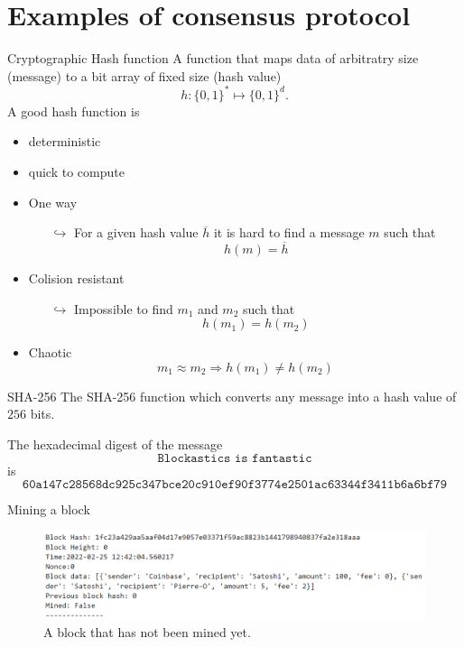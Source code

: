 \documentclass{beamer}
\begin{document}
\section{Examples of consensus protocol}
\begin{frame}{Cryptographic Hash function}
\small
A function that maps data of arbitratry size (message) to a bit array of fixed size (hash value)
$$
h:\{0,1\}^\ast\mapsto \{0,1\}^d. 
$$
A good hash function is
\begin{itemize}
\item deterministic
\item quick to compute
\item One way
\begin{itemize}
  \scriptsize
\item[$\hookrightarrow$] For a given hash value $\overline{h}$ it is hard to find a message $m$ such that 
$$
h(m) = \overline{h}
$$
\end{itemize}
\item Colision resistant 
\begin{itemize}
\item[$\hookrightarrow$] Impossible to find $m_1$ and $m_2$ such that 
$$
h(m_1) = h(m_2)
$$
\end{itemize}
\item Chaotic
$$m_1\approx m_2\Rightarrow  h(m_1) \neq h(m_2)$$
\end{itemize}
\end{frame}
\begin{frame}{SHA-256}
The SHA-256 function which converts any message into a hash value of $256$ bits.
\begin{tcolorbox}[enhanced,drop shadow, title=Example]
The hexadecimal digest of the message
$$
\texttt{Blockastics is fantastic}
$$
is 
\footnotesize
$$
\texttt{60a147c28568dc925c347bce20c910ef90f3774e2501ac63344f3411b6a6bf79}
$$
\end{tcolorbox}
\end{frame}
\begin{frame}{Mining a block}
\begin{figure}[!ht]
    \includegraphics[width = \textwidth]{../../Figures/block_not_mined.png}
    \captionsetup{width=0.8\textwidth}
    \centering
    \caption{A block that has not been mined yet.}
    \label{fig:block_not_mined}
\end{figure}
\end{frame}
\end{document}
